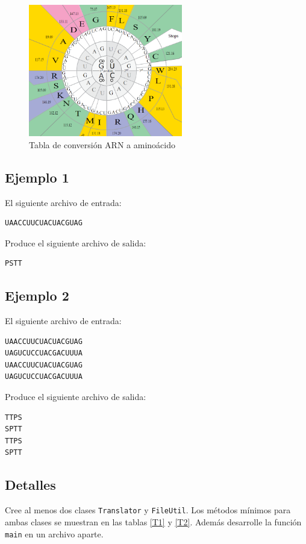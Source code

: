 \begin{figure}[H]
\centering
\includegraphics[width=0.6\textwidth]{imgs/Labo2/cod-gen}
\caption{Tabla de conversión ARN a aminoácido}
\label{fig:1}
\end{figure}

\subsection{Ejemplo 1}
El siguiente archivo de entrada:
\begin{lstlisting}[backgroundcolor=\color{verdito}]
UAACCUUCUACUACGUAG
\end{lstlisting}
Produce el siguiente archivo de salida:
\begin{lstlisting}[backgroundcolor=\color{verdito}]
PSTT
\end{lstlisting}

\subsection{Ejemplo 2}
El siguiente archivo de entrada:
\begin{lstlisting}[backgroundcolor=\color{verdito}]
UAACCUUCUACUACGUAG
UAGUCUCCUACGACUUUA
UAACCUUCUACUACGUAG
UAGUCUCCUACGACUUUA
\end{lstlisting}
Produce el siguiente archivo de salida:
\begin{lstlisting}[backgroundcolor=\color{verdito}]
TTPS
SPTT
TTPS
SPTT
\end{lstlisting}

\subsection{Detalles}
Cree al menos dos clases \texttt{Translator} y \texttt{FileUtil}. Los métodos mínimos para ambas clases se muestran en las tablas \ref{T1} y \ref{T2}. Además desarrolle la función \texttt{main} en un archivo aparte.


